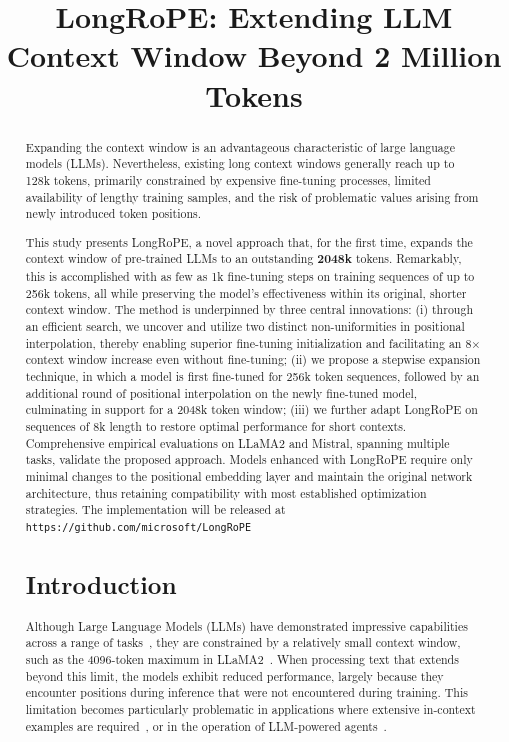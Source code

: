 \title{LongRoPE: Extending LLM Context Window Beyond 2 Million Tokens}

\begin{abstract}
Expanding the context window is an advantageous characteristic of large language models (LLMs). Nevertheless, existing long context windows generally reach up to 128k tokens, primarily constrained by expensive fine-tuning processes, limited availability of lengthy training samples, and the risk of problematic values arising from newly introduced token positions.

This study presents LongRoPE, a novel approach that, for the first time, expands the context window of pre-trained LLMs to an outstanding \textbf{2048k} tokens. Remarkably, this is accomplished with as few as 1k fine-tuning steps on training sequences of up to 256k tokens, all while preserving the model’s effectiveness within its original, shorter context window. The method is underpinned by three central innovations: (i) through an efficient search, we uncover and utilize two distinct non-uniformities in positional interpolation, thereby enabling superior fine-tuning initialization and facilitating an 8$\times$ context window increase even without fine-tuning; (ii) we propose a stepwise expansion technique, in which a model is first fine-tuned for 256k token sequences, followed by an additional round of positional interpolation on the newly fine-tuned model, culminating in support for a 2048k token window; (iii) we further adapt LongRoPE on sequences of 8k length to restore optimal performance for short contexts. Comprehensive empirical evaluations on LLaMA2 and Mistral, spanning multiple tasks, validate the proposed approach. Models enhanced with LongRoPE require only minimal changes to the positional embedding layer and maintain the original network architecture, thus retaining compatibility with most established optimization strategies. The implementation will be released at \texttt{https://github.com/microsoft/LongRoPE}

\section{Introduction}

Although Large Language Models (LLMs) have demonstrated impressive capabilities across a range of tasks~\cite{gpt4,llama2}, they are constrained by a relatively small context window, such as the 4096-token maximum in LLaMA2~\cite{llama2}. When processing text that extends beyond this limit, the models exhibit reduced performance, largely because they encounter positions during inference that were not encountered during training. This limitation becomes particularly problematic in applications where extensive in-context examples are required~\cite{Huang2023FewerIM}, or in the operation of LLM-powered agents~\cite{park2023generative,madaan2023selfrefine}.


\end{abstract}
